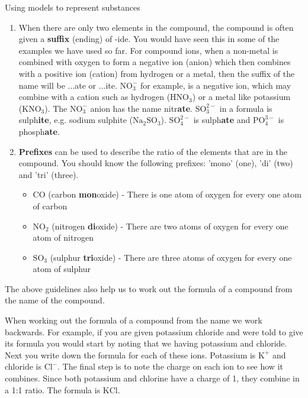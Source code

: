 \begin{activity}{Using models to represent substances}
\begin{enumerate}[noitemsep, label=\textbf{\arabic*}. ]
    \par
  \label{m38708*uid42}\item When there are only two elements in the compound, the compound is often given a \textbf{suffix} (ending) of -ide. You would have seen this in some of the examples we have used so far. For compound ions, when a non-metal is combined with oxygen to form a negative ion (anion) which then combines with a positive ion (cation) from hydrogen or a metal, then the suffix of the name will be ...ate or ...ite. $\mathrm{NO}_{3}^{-}$ for example, is a negative ion, which may combine with a cation such as hydrogen ($\mathrm{HNO}{}_{3}$) or a metal like potassium (KNO$_\text{3}$). The $\mathrm{NO}_{3}^{-}$ anion has the name nitr\textbf{ate}. $\mathrm{SO}_{3}^{2-}$ in a formula is sulph\textbf{ite}, e.g. sodium sulphite ($\mathrm{Na}{}_{2}\mathrm{SO}{}_{3}$).\newline
     $\mathrm{SO}_{4}^{2-}$ is sulph\textbf{ate} and $\mathrm{PO}_{4}^{3-}$ is phosph\textbf{ate}.
\label{m38708*uid43}\item \textbf{Prefixes} can be used to describe the ratio of the elements that are in the compound. You should know the following prefixes: 'mono' (one), 'di' (two) and 'tri' (three).
\label{m38708*id64977}\begin{itemize}[noitemsep]
            \label{m38708*uid44}\item $\mathrm{CO}$ (carbon \textbf{mon}oxide) - There is one atom of oxygen for every one atom of carbon
\label{m38708*uid45}\item $\mathrm{NO}{}_{2}$ (nitrogen \textbf{di}oxide) - There are two atoms of oxygen for every one atom of nitrogen
\label{m38708*uid46}\item $\mathrm{SO}{}_{3}$ (sulphur \textbf{tri}oxide) - There are three atoms of oxygen for every one atom of sulphur
\end{itemize}
        \end{enumerate}
\label{m38708*id537402}The above guidelines also help us to work out the formula of a compound from the name of the compound.\par 
\label{m38708*eip-178}When working out the formula of a compound from the name we work backwards. For example, if you are given potassium chloride and were told to give its formula you would start by noting that we having potassium and chloride. Next you write down the formula for each of these ions. Potassium is ${\mathrm{K}}^{+}$ and chloride is ${\mathrm{Cl}}^{-}$. The final step is to note the charge on each ion to see how it combines. Since both potassium and chlorine have a charge of 1, they combine in a 1:1 ratio. The formula is $\mathrm{KCl}$.\par \label{m38708*notfhsst!!!underscore!!!id252}

\end{activity}
